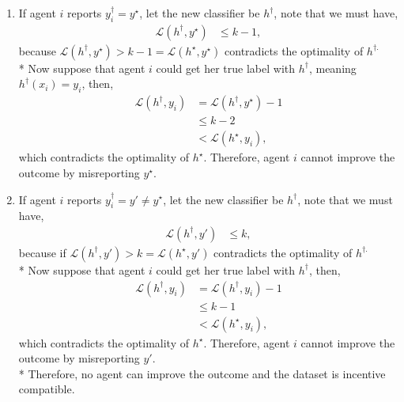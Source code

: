 \documentclass{article}
\begin{document}
\begin{enumerate}
\item If agent $i $ reports $y^{\dagger}_{i} = y^\star $, let the new classifier be $h^{\dagger}$, note that we must have,
\begin{align*}
\mathcal{L}\left(h^{\dagger}, y^\star \right) &\leq  k - 1,
\end{align*}
because $\mathcal{L}\left(h^{\dagger}, y^\star \right) > k - 1 = \mathcal{L}\left(h^\star , y^\star \right)$ contradicts the optimality of $h^{\dagger.}$
\\* Now suppose that agent $i $ could get her true label with $h^{\dagger}$, meaning $h^{\dagger}\left(x_{i}\right) = y_{i}$, then,
\begin{align*}
\mathcal{L}\left(h^{\dagger}, y_{i}\right) &= \mathcal{L}\left(h^{\dagger}, y^\star \right) - 1
\\ &\leq  k - 2
\\ &< \mathcal{L}\left(h^\star , y_{i}\right),
\end{align*}
which contradicts the optimality of $h^\star $. Therefore, agent $i $ cannot improve the outcome by misreporting $y^\star $.
\item If agent $i $ reports $y^{\dagger}_{i} = y' \neq  y^\star $, let the new classifier be $h^{\dagger}$, note that we must have,
\begin{align*}
\mathcal{L}\left(h^{\dagger}, y'\right) &\leq  k,
\end{align*}
because if $\mathcal{L}\left(h^{\dagger}, y'\right) > k = \mathcal{L}\left(h^\star , y'\right)$ contradicts the optimality of $h^{\dagger.}$
\\* Now suppose that agent $i $ could get her true label with $h^{\dagger}$, then,
\begin{align*}
\mathcal{L}\left(h^{\dagger}, y_{i}\right) &= \mathcal{L}\left(h^{\dagger}, y_{i}\right) - 1
\\ &\leq  k - 1
\\ &< \mathcal{L}\left(h^\star , y_{i}\right),
\end{align*}
which contradicts the optimality of $h^\star $. Therefore, agent $i $ cannot improve the outcome by misreporting $y'$.
\\* Therefore, no agent can improve the outcome and the dataset is incentive compatible.
\newline \newline
\end{enumerate}
\end{document}
